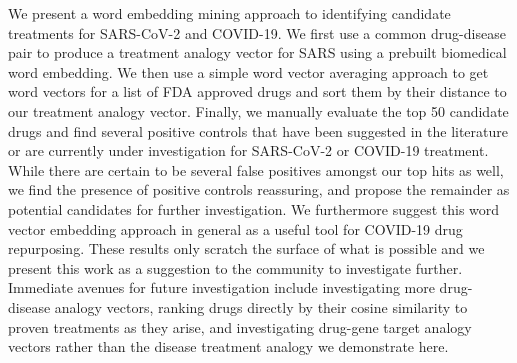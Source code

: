 \documentclass{article}
\begin{document}
We present a word embedding mining approach to identifying candidate treatments for SARS-CoV-2 and COVID-19.
We first use a common drug-disease pair to produce a treatment analogy vector for SARS using a prebuilt biomedical word embedding.
We then use a simple word vector averaging approach to get word vectors for a list of FDA approved drugs and sort them by their distance to our treatment analogy vector.
Finally, we manually evaluate the top 50 candidate drugs and find several positive controls that have been suggested in the literature or are currently under investigation for SARS-CoV-2 or COVID-19 treatment.
While there are certain to be several false positives amongst our top hits as well, we find the presence of positive controls reassuring, and propose the remainder as potential candidates for further investigation.
We furthermore suggest this word vector embedding approach in general as a useful tool for COVID-19 drug repurposing.
These results only scratch the surface of what is possible and we present this work as a suggestion to the community to investigate further.
Immediate avenues for future investigation include investigating more drug-disease analogy vectors, ranking drugs directly by their cosine similarity to proven treatments as they arise, and investigating drug-gene target analogy vectors rather than the disease treatment analogy we demonstrate here.



\end{document}
